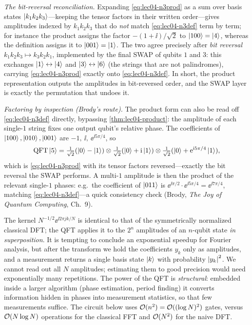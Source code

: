 \begin{example}[The $n=3$ QFT and the bit-reversal step, in full]
\emph{The bit-reversal reconciliation.} Expanding \cref{eq:lec04-n3prod} as a
sum over basis states $\ket{k_1 k_2 k_3}$---keeping the tensor factors in their
written order---gives amplitudes indexed by $k_1 k_2 k_3$ that do \emph{not}
match \cref{eq:lec04-n3def} term by term; for instance the product assigns the
factor $-(1+\ii)/\sqrt2$ to $\ket{100}=\ket{4}$, whereas the definition assigns
it to $\ket{001}=\ket{1}$. The two agree precisely after \emph{bit reversal}
$k_1 k_2 k_3\mapsto k_3 k_2 k_1$, implemented by the final SWAP of qubits $1$ and
$3$: this exchanges $\ket{1}\leftrightarrow\ket{4}$ and
$\ket{3}\leftrightarrow\ket{6}$ (the strings that are not palindromes),
carrying \cref{eq:lec04-n3prod} exactly onto \cref{eq:lec04-n3def}. In short,
the product representation outputs the amplitudes in bit-reversed order, and the
SWAP layer is exactly the permutation that undoes it.

\emph{Factoring by inspection (Brody's route).} The product form can also be read off
\cref{eq:lec04-n3def} directly, bypassing \cref{thm:lec04-product}: the amplitude of each
single-$1$ string fixes one output qubit's relative phase. The coefficients of
$\ket{100},\ket{010},\ket{001}$ are $-1,\ \ii,\ \ee^{\ii 5\pi/4}$, so
\[
  \mathrm{QFT}\ket{5}=\tfrac1{\sqrt2}(\ket0-\ket1)\otimes\tfrac1{\sqrt2}(\ket0+\mathrm{i}\ket1)
  \otimes\tfrac1{\sqrt2}(\ket0+\mathrm{e}^{\mathrm{i} 5\pi/4}\ket1),
\]
which is \cref{eq:lec04-n3prod} with its tensor factors reversed---exactly the bit
reversal the SWAP performs. A multi-$1$ amplitude is then the product of the relevant
single-$1$ phases: e.g.\ the coefficient of $\ket{011}$ is
$\ee^{\ii\pi/2}\cdot\ee^{\ii 5\pi/4}=\ee^{\ii 7\pi/4}$, matching \cref{eq:lec04-n3def}---a
quick consistency check (Brody, \emph{The Joy of Quantum Computing}, Ch.~9).
\end{example}

\begin{remark}
\label{rem:lec04-dft}
The kernel $N^{-1/2}\ee^{\ii 2\pi jk/N}$ is identical to that of the
symmetrically normalized classical DFT; the QFT applies it to the $2^{n}$
amplitudes of an $n$-qubit state \emph{in superposition}. It is tempting to
conclude an exponential speedup for Fourier analysis, but after the transform we
hold the coefficients $y_k$ only as amplitudes, and a measurement returns a
single basis state $\ket{k}$ with probability $\left\lvert y_k \right\rvert^2$. We cannot read out
all $N$ amplitudes; estimating them to good precision would need exponentially
many repetitions. The power of the QFT is \emph{structural}: embedded inside a
larger algorithm (phase estimation, period finding) it converts information
hidden in phases into measurement statistics, so that few measurements suffice.
The circuit below uses $\mathcal{O}(n^2)=\mathcal{O}((\log N)^2)$ gates, versus $\mathcal{O}(N\log
N)$ operations for the classical FFT and $\mathcal{O}(N^2)$ for the naive DFT.
\end{remark}

